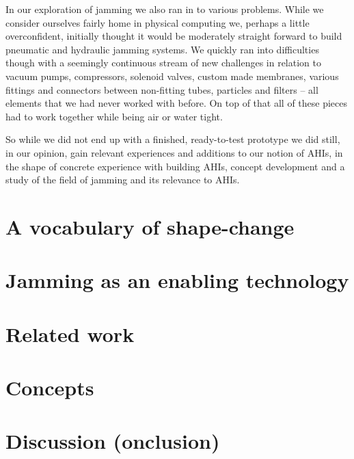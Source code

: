 In our exploration of jamming we also ran in to various problems.
While we consider ourselves fairly home in physical computing we, perhaps a little overconfident, initially thought it would be moderately straight forward to build pneumatic and hydraulic jamming systems.
We quickly ran into difficulties though with a seemingly continuous stream of new challenges in relation to vacuum pumps, compressors, solenoid valves, custom made membranes, various fittings and connectors between non-fitting tubes, particles and filters -- all elements that we had never worked with before.
On top of that all of these pieces had to work together while being air or water tight. 

So while we did not end up with a finished, ready-to-test prototype we did still, in our opinion, gain relevant experiences and additions to our notion of AHIs, in the shape of concrete experience with building AHIs, concept development and a study of the field of jamming and its relevance to AHIs. 

\section{A vocabulary of shape-change}
\label{ch:jamming:shape-change} 


\section{Jamming as an enabling technology}
\label{ch:jamming:enabling-technology} 


\section{Related work}
\label{ch:jamming:related-work} 


\section{Concepts}
\label{ch:jamming:concepts} 


\section{Discussion (onclusion)}

